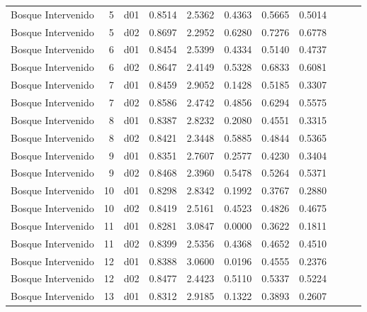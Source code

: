 \begin{landscape}
\begin{longtable}{p{2cm}rrrrrrrrrr}
    Bosque Intervenido    &          5 &     d01 &   0.8514 &  2.5362 &        0.4363 &           0.5665 &  0.5014 \\
    Bosque Intervenido    &          5 &     d02 &   0.8697 &  2.2952 &        0.6280 &           0.7276 &  0.6778 \\
    Bosque Intervenido    &          6 &     d01 &   0.8454 &  2.5399 &        0.4334 &           0.5140 &  0.4737 \\
    Bosque Intervenido    &          6 &     d02 &   0.8647 &  2.4149 &        0.5328 &           0.6833 &  0.6081 \\
    Bosque Intervenido    &          7 &     d01 &   0.8459 &  2.9052 &        0.1428 &           0.5185 &  0.3307 \\
    Bosque Intervenido    &          7 &     d02 &   0.8586 &  2.4742 &        0.4856 &           0.6294 &  0.5575 \\
    Bosque Intervenido    &          8 &     d01 &   0.8387 &  2.8232 &        0.2080 &           0.4551 &  0.3315 \\
    Bosque Intervenido    &          8 &     d02 &   0.8421 &  2.3448 &        0.5885 &           0.4844 &  0.5365 \\
    Bosque Intervenido    &          9 &     d01 &   0.8351 &  2.7607 &        0.2577 &           0.4230 &  0.3404 \\
    Bosque Intervenido    &          9 &     d02 &   0.8468 &  2.3960 &        0.5478 &           0.5264 &  0.5371 \\
    Bosque Intervenido    &         10 &     d01 &   0.8298 &  2.8342 &        0.1992 &           0.3767 &  0.2880 \\
    Bosque Intervenido    &         10 &     d02 &   0.8419 &  2.5161 &        0.4523 &           0.4826 &  0.4675 \\
    Bosque Intervenido    &         11 &     d01 &   0.8281 &  3.0847 &        0.0000 &           0.3622 &  0.1811 \\
    Bosque Intervenido    &         11 &     d02 &   0.8399 &  2.5356 &        0.4368 &           0.4652 &  0.4510 \\
    Bosque Intervenido    &         12 &     d01 &   0.8388 &  3.0600 &        0.0196 &           0.4555 &  0.2376 \\
    Bosque Intervenido    &         12 &     d02 &   0.8477 &  2.4423 &        0.5110 &           0.5337 &  0.5224 \\
    Bosque Intervenido    &         13 &     d01 &   0.8312 &  2.9185 &        0.1322 &           0.3893 &  0.2607 \\

\end{longtable}
\end{landscape}
